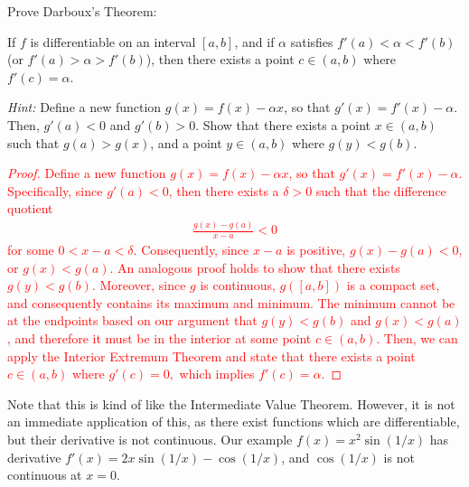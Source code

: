 \documentclass{ximera}
\begin{document}
\begin{exercise}
    Prove Darboux's Theorem:
    \begin{theorem}
        If $f$ is differentiable on an interval $[a,b]$, and if $\alpha$ satisfies $f'(a) < \alpha < f'(b)$ (or $f'(a) > \alpha >f'(b)$), then there exists a point $c \in (a,b)$ where $f'(c)= \alpha$.
    \end{theorem}
    \textit{Hint:} Define a new function $g(x) = f(x) -\alpha x$, so that $g'(x) = f'(x) - \alpha$.  Then, $g'(a) < 0$ and $g'(b) > 0$.  Show that there exists a point $x \in (a,b)$ such that $g(a) > g(x)$, and a point $y \in (a,b)$ where $g(y) < g(b)$.
\end{exercise}
\vspace{-0.3in}
\textcolor{red}{
\begin{proof}
    Define a new function $g(x) = f(x) -\alpha x$, so that $g'(x) = f'(x) - \alpha$.  Specifically, since $g'(a)< 0$, then there exists a $\delta > 0$ such that the difference quotient
\begin{align*}
    \frac{g(x) -g(a)}{x-a} < 0 
\end{align*}
for some $0 < x-a < \delta$.  Consequently, since $x-a$ is positive, $g(x) - g(a) < 0$, or $g(x) < g(a)$.  An analogous proof holds to show that there exists $g(y) < g(b)$.  Moreover, since $g$ is continuous, $g([a,b])$ is a compact set, and consequently contains its maximum and minimum.  The minimum cannot be at the endpoints based on our argument that $g(y) < g(b)$ and $g(x) < g(a)$, and therefore it must be in the interior at some point $c \in (a,b)$.  Then, we can apply the Interior Extremum Theorem and state that there exists a point $c\in (a,b)$ where $g'(c) = 0,$ which implies $f'(c) = \alpha$.
\end{proof}
}

Note that this is kind of like the Intermediate Value Theorem.  However, it is not an immediate application of this, as there exist functions which are differentiable, but their derivative is not continuous.  Our example $f(x) = x^2\sin(1/x)$ has derivative $f'(x) = 2x\sin(1/x) - \cos(1/x)$, and $\cos(1/x)$ is not continuous at $x=0$.
\end{document}
